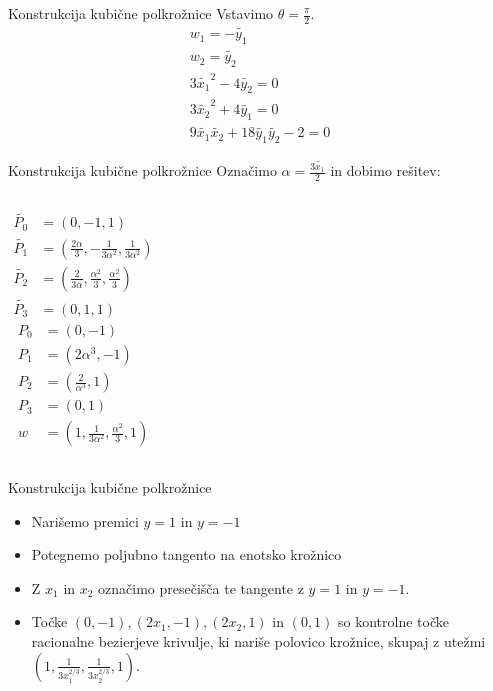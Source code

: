 \documentclass[t]{beamer}
\begin{document}
\begin{frame}{Konstrukcija kubične polkrožnice}
Vstavimo $\theta = \frac{\pi}{2}$.
\begin{align*}
w_{1} = - \tilde{y_{1}} \\
w_{2} = \tilde{y_{2}} \\
3\tilde{x_{1}}^2 - 4 \tilde{y_{2}} = 0 \\
3 \tilde{x_{2}}^2 + 4 \tilde{y_{1}} = 0 \\
9 \tilde{x_{1}} \tilde{x_{2}} + 18 \tilde{y_{1}} \tilde{y_{2}} - 2 = 0
\end{align*}
\end{frame}
\begin{frame}{Konstrukcija kubične polkrožnice}
Označimo $\alpha = \frac{3\tilde{x_{1}}}{2}$ in dobimo rešitev:

\begin{columns}
\begin{align*}
\tilde{P_{0}} &= (0,-1,1) \\
\tilde{P_{1}} &= (\frac{2\alpha}{3},-\frac{1}{3\alpha^2},\frac{1}{3\alpha^2}) \\
\tilde{P_{2}} &= (\frac{2}{3\alpha},\frac{\alpha^2}{3}, \frac{\alpha^2}{3}) \\
\tilde{P_{3}} &= (0, 1,1)
\end{align*}
\begin{align*}
P_{0} &= (0,-1) \\
P_{1} &= (2\alpha^3, -1) \\
P_{2} &= (\frac{2}{\alpha^3}, 1) \\
P_{3} &= (0, 1) \\
w &= (1, \frac{1}{3\alpha^2}, \frac{\alpha^2}{3}, 1)
\end{align*}
\end{columns}

\end{frame}
\begin{frame}{Konstrukcija kubične polkrožnice}
\begin{itemize}
\item Narišemo premici $y=1$ in $y = -1$
\item Potegnemo poljubno tangento na enotsko krožnico
\item Z $x_{1}$ in $x_{2}$ označimo presečišča te tangente z $y=1$ in $y=-1$.
\item Točke $(0,-1), (2x_{1}, -1), (2x_{2}, 1)$ in $(0,1)$ so kontrolne točke racionalne bezierjeve krivulje, ki nariše polovico krožnice, skupaj z utežmi $(1, \frac{1}{3x_{1}^{2/3}}, \frac{1}{3x_{2}^{2/3}}, 1)$.

\end{itemize}
\end{frame}
\end{document}
